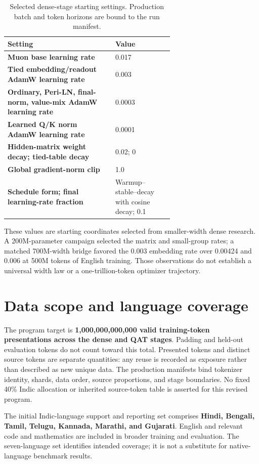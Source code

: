 \documentclass[11pt]{article}
\begin{document}
\begin{table}[ht]
\centering
\caption{Selected dense-stage starting settings. Production batch and token
horizons are bound to the run manifest.}
\label{tab:optimizer}
\small
\begin{tabularx}{\linewidth}{@{}>{\bfseries}p{0.65\linewidth}X@{}}
\toprule
Setting & Value \\
\midrule
Muon base learning rate & 0.017 \\
Tied embedding/readout AdamW learning rate & 0.003 \\
Ordinary, Peri-LN, final-norm, value-mix AdamW learning rate & 0.0003 \\
Learned Q/K norm AdamW learning rate & 0.0001 \\
Hidden-matrix weight decay; tied-table decay & 0.02; 0 \\
Global gradient-norm clip & 1.0 \\
Schedule form; final learning-rate fraction & Warmup--stable--decay with cosine decay; 0.1 \\
\bottomrule
\end{tabularx}
\end{table}

These values are starting coordinates selected from smaller-width dense
research. A 200M-parameter campaign selected the matrix and small-group
rates; a matched 700M-width bridge favored the 0.003 embedding rate over
0.00424 and 0.006 at 500M tokens of English training. Those observations do
not establish a universal width law or a one-trillion-token optimizer
trajectory.

\section{Data scope and language coverage}

The program target is \textbf{1,000,000,000,000 valid training-token
presentations across the dense and QAT stages}. Padding and held-out
evaluation tokens do not count toward this total. Presented tokens and
distinct source tokens are separate quantities: any reuse is recorded as
exposure rather than described as new unique data. The production manifests
bind tokenizer identity, shards, data order, source proportions, and stage
boundaries. No fixed 40\% Indic allocation or inherited source-token table
is asserted for this revised program.

The initial Indic-language support and reporting set comprises \textbf{Hindi,
Bengali, Tamil, Telugu, Kannada, Marathi, and Gujarati}. English and
relevant code and mathematics are included in broader training and
evaluation. The seven-language set identifies intended coverage; it is not
a substitute for native-language benchmark results.
\end{document}
